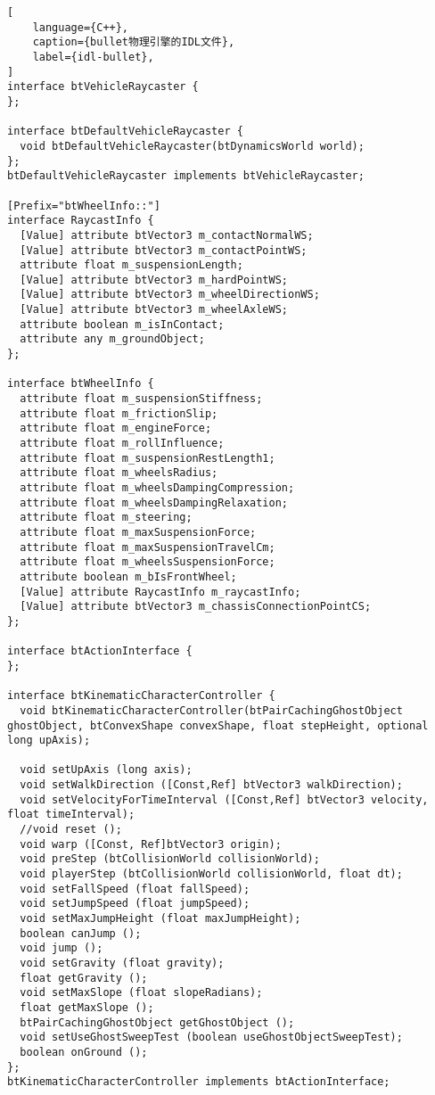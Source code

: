 \begin{lstlisting}[
    language={C++},
    caption={bullet物理引擎的IDL文件},
    label={idl-bullet},
]
interface btVehicleRaycaster {
};

interface btDefaultVehicleRaycaster {
  void btDefaultVehicleRaycaster(btDynamicsWorld world);
};
btDefaultVehicleRaycaster implements btVehicleRaycaster;

[Prefix="btWheelInfo::"]
interface RaycastInfo {
  [Value] attribute btVector3 m_contactNormalWS;
  [Value] attribute btVector3 m_contactPointWS;
  attribute float m_suspensionLength;
  [Value] attribute btVector3 m_hardPointWS;
  [Value] attribute btVector3 m_wheelDirectionWS;
  [Value] attribute btVector3 m_wheelAxleWS;
  attribute boolean m_isInContact;
  attribute any m_groundObject;
};

interface btWheelInfo {
  attribute float m_suspensionStiffness;
  attribute float m_frictionSlip;
  attribute float m_engineForce;
  attribute float m_rollInfluence;
  attribute float m_suspensionRestLength1;
  attribute float m_wheelsRadius;
  attribute float m_wheelsDampingCompression;
  attribute float m_wheelsDampingRelaxation;
  attribute float m_steering;
  attribute float m_maxSuspensionForce;
  attribute float m_maxSuspensionTravelCm;
  attribute float m_wheelsSuspensionForce;
  attribute boolean m_bIsFrontWheel;
  [Value] attribute RaycastInfo m_raycastInfo;
  [Value] attribute btVector3 m_chassisConnectionPointCS;
};

interface btActionInterface {
};

interface btKinematicCharacterController {
  void btKinematicCharacterController(btPairCachingGhostObject ghostObject, btConvexShape convexShape, float stepHeight, optional long upAxis);

  void setUpAxis (long axis);
  void setWalkDirection ([Const,Ref] btVector3 walkDirection);
  void setVelocityForTimeInterval ([Const,Ref] btVector3 velocity, float timeInterval);
  //void reset ();
  void warp ([Const, Ref]btVector3 origin);
  void preStep (btCollisionWorld collisionWorld);
  void playerStep (btCollisionWorld collisionWorld, float dt);
  void setFallSpeed (float fallSpeed);
  void setJumpSpeed (float jumpSpeed);
  void setMaxJumpHeight (float maxJumpHeight);
  boolean canJump ();
  void jump ();
  void setGravity (float gravity);
  float getGravity ();
  void setMaxSlope (float slopeRadians);
  float getMaxSlope ();
  btPairCachingGhostObject getGhostObject ();
  void setUseGhostSweepTest (boolean useGhostObjectSweepTest);
  boolean onGround ();
};
btKinematicCharacterController implements btActionInterface;


\end{lstlisting}
